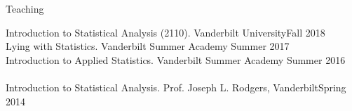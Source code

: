 \begin{rSection}{\textrm{Teaching}}
\begin{comment}
Data Science for Psychologists in \R (703). Wake Forest University\hfill{Spring 2023\textsuperscript{*}, Spring 2025}
\hspace*{6 mm} \href{https://datascience4psych.github.io/DataScience4Psych/}{\color{blue} datascience4psych.github.io/DataScience4Psych}\hfill{Spring 2021\textsuperscript{*}; Spring 2022}\smallskip\\
Psychological Testing  (362). Wake Forest University \hfill{Spring 2020;\textsuperscript{*} \href{https://www.youtube.com/playlist?list=PLKrrdtYgOUYYgag4erySD7L0jDcZGMlS_}{\color{blue}Spring 2021\noteBns}}
\hspace* {6 mm} \href{https://r-computing-lab.github.io/psychtesting/}{\color{blue} r-computing-lab.github.io/psychtesting}\smallskip\\
Personality (255). Wake Forest University \hfill{Fall 2021; \href{https://www.youtube.com/playlist?list=PLKrrdtYgOUYZpENpYddjG8n_q3bfbx8Kr}{Fall 2022x2\noteBns}}\\
\hspace*{6 mm} \href{https://smasongarrison.github.io/personality/}{\color{blue} smasongarrison.github.io/personality}\hfill{Fall 2019; Spring 2020;\textsuperscript{*} \href{https://www.youtube.com/playlist?list=PLKrrdtYgOUYZpENpYddjG8n_q3bfbx8Kr}{\color{blue}Fall 2020x2\textsuperscript{*}\noteBns}}\smallskip\\
\hspace* {6 mm}\smallskip\\
\end{comment}
Introduction to Statistical Analysis (2110). Vanderbilt University\hfill {Fall 2018}\\
Lying with Statistics. Vanderbilt Summer Academy \hfill{Summer 2017}\\
Introduction to Applied Statistics. Vanderbilt Summer Academy \hfill{Summer 2016}\smallskip\\
\\
Introduction to Statistical Analysis. Prof. Joseph L. Rodgers, Vanderbilt\hfill{Spring 2014}\\

\end{rSection}

